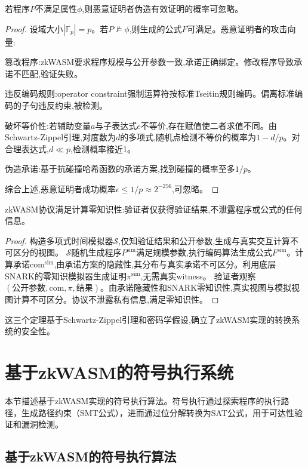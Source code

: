 \begin{theorem}[可靠性]
若程序$P$不满足属性$\phi$,则恶意证明者伪造有效证明的概率可忽略。
\end{theorem}

\begin{proof}
设域大小$|\mathbb{F}_p| = p$。若$P \not\models \phi$,则生成的公式$F$可满足。恶意证明者的攻击向量:

篡改程序:zkWASM要求程序规模与公开参数一致,承诺正确绑定。修改程序导致承诺不匹配,验证失败。

违反编码规则:operator constraint强制运算符按标准Tseitin规则编码。偏离标准编码的子句违反约束,被检测。

破坏等价性:若辅助变量$a$与子表达式$e$不等价,存在赋值使二者求值不同。由Schwartz-Zippel引理,对度数为$d$的多项式,随机点检测不等价的概率为$1 - d/p$。对合理表达式,$d \ll p$,检测概率接近1。

伪造承诺:基于抗碰撞哈希函数的承诺方案,找到碰撞的概率至多$1/p$。

综合上述,恶意证明者成功概率$\epsilon \leq 1/p \approx 2^{-256}$,可忽略。
\end{proof}

\begin{theorem}[零知识性]
zkWASM协议满足计算零知识性:验证者仅获得验证结果,不泄露程序或公式的任何信息。
\end{theorem}

\begin{proof}
构造多项式时间模拟器$\mathcal{S}$,仅知验证结果和公开参数,生成与真实交互计算不可区分的视图。
$\mathcal{S}$随机生成程序$P^{\text{sim}}$满足规模参数,执行编码算法生成公式$F^{\text{sim}}$。计算承诺$\text{com}^{\text{sim}}$,由承诺方案的隐藏性,其分布与真实承诺不可区分。利用底层SNARK的零知识模拟器生成证明$\pi^{\text{sim}}$,无需真实witness。
验证者观察$(公开参数, \text{com}, \pi, 结果)$。由承诺隐藏性和SNARK零知识性,真实视图与模拟视图计算不可区分。协议不泄露私有信息,满足零知识性。
\end{proof}

这三个定理基于Schwartz-Zippel引理和密码学假设,确立了zkWASM实现的转换系统的安全性。

\section{基于zkWASM的符号执行系统}

本节描述基于zkWASM实现的符号执行算法。符号执行通过探索程序的执行路径，生成路径约束（SMT公式），进而通过位分解转换为SAT公式，用于可达性验证和漏洞检测。

\subsection{基于zkWASM的符号执行算法}

